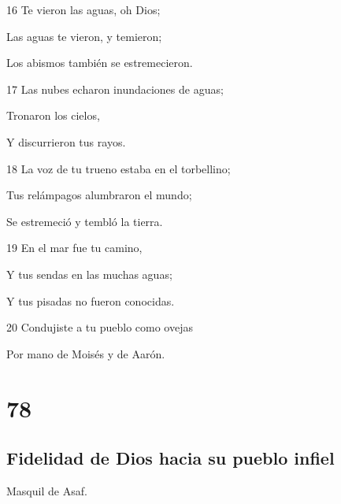 \par 16 Te vieron las aguas, oh Dios;
\par Las aguas te vieron, y temieron;
\par Los abismos también se estremecieron.
\par 17 Las nubes echaron inundaciones de aguas;
\par Tronaron los cielos,
\par Y discurrieron tus rayos.
\par 18 La voz de tu trueno estaba en el torbellino;
\par Tus relámpagos alumbraron el mundo;
\par Se estremeció y tembló la tierra.
\par 19 En el mar fue tu camino,
\par Y tus sendas en las muchas aguas;
\par Y tus pisadas no fueron conocidas.
\par 20 Condujiste a tu pueblo como ovejas
\par Por mano de Moisés y de Aarón.

\chapter{78}

\section*{Fidelidad de Dios hacia su pueblo infiel}

\par Masquil de Asaf.

